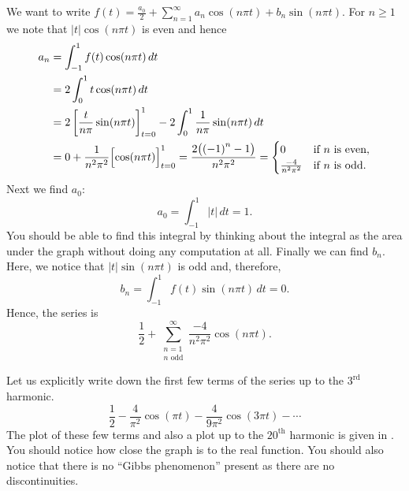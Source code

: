 \documentclass{ximera}
\begin{document}
\begin{exampleSol}
    We want to write $f(t) = \frac{a_0}{2} + \sum_{n=1}^\infty a_n \cos (n \pi t) + b_n \sin (n \pi t)$.  For $n \geq 1$ we note that $\lvert t \rvert \cos (n \pi t)$ is even and hence
    \begin{equation*}
        \begin{split}
            a_n & = \int_{-1}^1 f(t) \cos (n \pi t) \, dt \\
            & = 2 \int_{0}^1 t \cos (n \pi t) \, dt \\
            & = 2 \left[ \frac{t}{n \pi} \sin (n \pi t) \right]_{t=0}^1 - 2 \int_{0}^1 \frac{1}{n \pi} \sin (n \pi t) \, dt \\
            & =  0 + \frac{1}{n^2 \pi^2} \Bigl[ \cos (n \pi t) \Bigr]_{t=0}^1 =  \frac{2 \bigl( {(-1)}^n -1 \bigr) }{n^2 \pi^2} =
            \begin{cases}
                0 & \text{if } n \text{ is even} , \\
                \frac{-4 }{n^2 \pi^2} & \text{if } n \text{ is odd}  .
            \end{cases}
        \end{split}
    \end{equation*}
    Next we find $a_0$:
    \begin{equation*}
        a_0 = \int_{-1}^1 \lvert t \rvert \, dt = 1 .
    \end{equation*}
    You should be able to find this integral by thinking about the integral as the area under the graph without doing any computation at all. Finally we can find $b_n$.  Here, we notice that $\lvert t \rvert \sin (n \pi t)$ is odd and, therefore,
    \begin{equation*}
        b_n = \int_{-1}^1 f(t) \sin (n \pi t) \, dt = 0 .
    \end{equation*}
    Hence, the series is 
    \begin{equation*}
        \frac{1}{2} + \sum_{\substack{n=1 \\ n \text{ odd}}}^\infty \frac{-4}{n^2 \pi^2} \cos (n \pi t) .
    \end{equation*}
    
    Let us explicitly write down the first few terms of the series up to the $3^{\text{rd}}$ harmonic.
    \begin{equation*}
        \frac{1}{2} - \frac{4}{\pi^2} \cos (\pi t) - \frac{4}{9 \pi^2} \cos (3 \pi t) - \cdots
    \end{equation*}
    The plot of these few terms and also a plot up to the ${20}^{\text{th}}$ harmonic is given in .  You should notice how close the graph is to the real function.  You should also notice that there is no ``Gibbs phenomenon'' present as there are no discontinuities.
    

\end{exampleSol}
\end{document}
